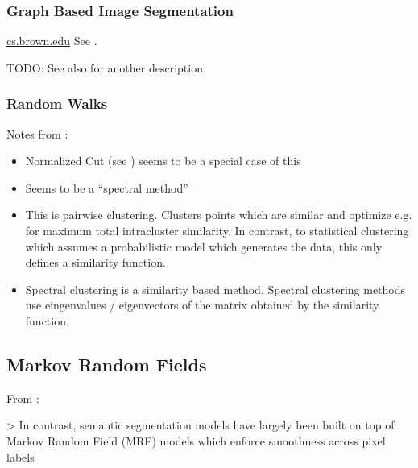 

\subsubsection{Graph Based Image Segmentation}%
\label{subsec:graph-based-image-segmentation}%
\href{http://cs.brown.edu/~pff/segment/}{cs.brown.edu}
See \cite{felzenszwalb2004efficient}.

TODO: See also \cite{pantofaru2005comparison} for another description.


\subsubsection{Random Walks}
Notes from \cite{meilpa2001learning}:

\begin{itemize}
    \item Normalized Cut (see \cite{shi2000normalized}) seems to be a special
          case of this
    \item Seems to be a \enquote{spectral method}
    \item This is pairwise clustering. Clusters points which are similar and
          optimize e.g. for maximum total intracluster similarity. In contrast,
          to statistical clustering which assumes a probabilistic model which
          generates the data, this only defines a similarity function.
    \item Spectral clustering is a similarity based method. Spectral clustering
          methods use eingenvalues / eigenvectors of the matrix obtained by the
          similarity function.
\end{itemize}


\subsection{Markov Random Fields}
From \cite{yang2012layered}:

> In contrast, semantic segmentation models have largely been built on top of
Markov Random Field (MRF) models which enforce smoothness across pixel labels

